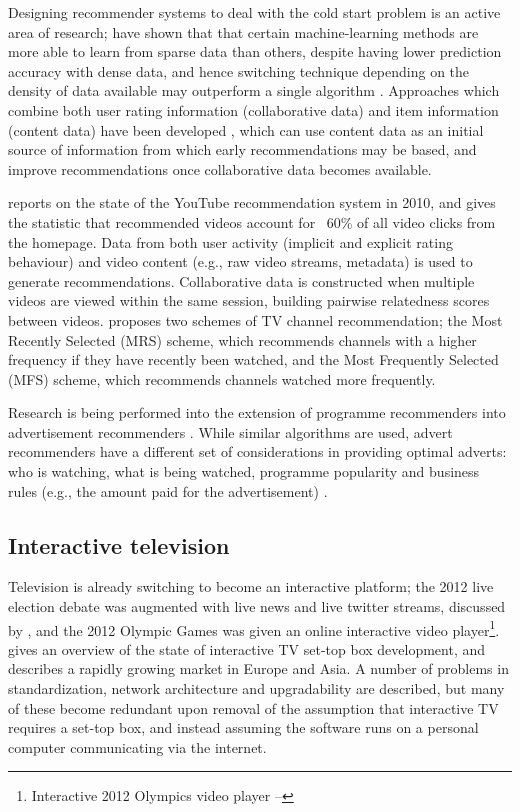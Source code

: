 	Designing recommender systems to deal with the cold start problem is an active area of research; \citet{cold-start-problem} have shown that that certain machine-learning methods are more able to learn from sparse data than others, despite having lower prediction accuracy with dense data, and hence switching technique depending on the density of data available may outperform a single algorithm . Approaches which combine both user rating information (collaborative data) and item information (content data) have been developed \citep{generative_models}, which can use content data as an initial source of information from which early recommendations may be based, and improve recommendations once collaborative data becomes available.

	\citet{davidson2012} reports on the state of the YouTube recommendation system in 2010, and gives the statistic that recommended videos account for ~60\% of all video clicks from the homepage. Data from both user activity (implicit and explicit rating behaviour) and video content (e.g., raw video streams, metadata) is used to generate recommendations. Collaborative data is constructed when multiple videos are viewed within the same session, building pairwise relatedness scores between videos. \citep{personalisedEPG} proposes two schemes of TV channel recommendation; the Most Recently Selected (MRS) scheme, which recommends channels with a higher frequency if they have recently been watched, and the Most Frequently Selected (MFS) scheme, which recommends channels watched more frequently.

	Research is being performed into the extension of programme recommenders into advertisement recommenders \citep{contextual_advertising}. While similar algorithms are used, advert recommenders have a different set of considerations in providing optimal adverts: who is watching, what is being watched, programme popularity and business rules (e.g., the amount paid for the advertisement) \citep{contextual_advertising}.

\subsection{Interactive television}

	Television is already switching to become an interactive platform; the 2012 live election debate was augmented with live news and live twitter streams, discussed by \citet{2010_election}, and the 2012 Olympic Games was given an online interactive video player\footnote{Interactive 2012 Olympics video player -- }. \citet{tv_stb_overview} gives an overview of the state of interactive TV set-top box development, and describes a rapidly growing market in Europe and Asia. A number of problems in standardization, network architecture and upgradability are described, but many of these become redundant upon removal of the assumption that interactive TV requires a set-top box, and instead assuming the software runs on a personal computer communicating via the internet.

